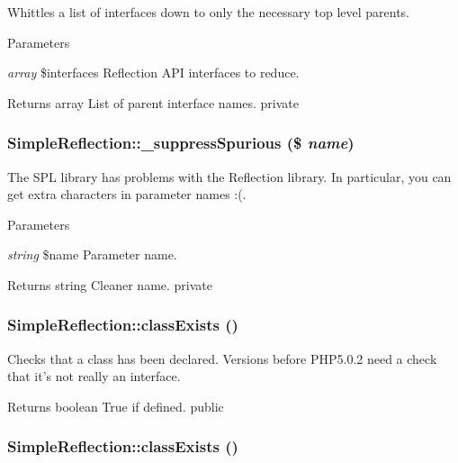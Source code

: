 \label{class_simple_reflection_ab619efb054cde5a01c7db7dece7884fa}
Whittles a list of interfaces down to only the necessary top level parents. 
\begin{DoxyParams}{Parameters}
\item[{\em array}]\$interfaces Reflection API interfaces to reduce. \end{DoxyParams}
\begin{DoxyReturn}{Returns}
array List of parent interface names.  private 
\end{DoxyReturn}
\hypertarget{class_simple_reflection_affdabe4bf112c447fbe6e1c9bae38ac3}{
\subsubsection[{\_\-suppressSpurious}]{\setlength{\rightskip}{0pt plus 5cm}SimpleReflection::\_\-suppressSpurious (\$ {\em name})}}
\label{class_simple_reflection_affdabe4bf112c447fbe6e1c9bae38ac3}
The SPL library has problems with the Reflection library. In particular, you can get extra characters in parameter names :(. 
\begin{DoxyParams}{Parameters}
\item[{\em string}]\$name Parameter name. \end{DoxyParams}
\begin{DoxyReturn}{Returns}
string Cleaner name.  private 
\end{DoxyReturn}
\hypertarget{class_simple_reflection_a168085582bea3184f879f72ca081d833}{
\subsubsection[{classExists}]{\setlength{\rightskip}{0pt plus 5cm}SimpleReflection::classExists ()}}
\label{class_simple_reflection_a168085582bea3184f879f72ca081d833}
Checks that a class has been declared. Versions before PHP5.0.2 need a check that it's not really an interface. \begin{DoxyReturn}{Returns}
boolean True if defined.  public 
\end{DoxyReturn}
\hypertarget{class_simple_reflection_a168085582bea3184f879f72ca081d833}{
\subsubsection[{classExists}]{\setlength{\rightskip}{0pt plus 5cm}SimpleReflection::classExists ()}}
